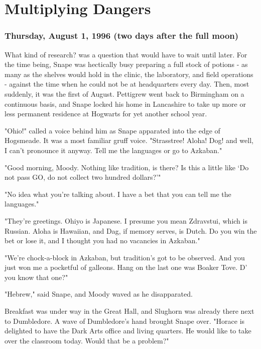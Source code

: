 
\chapter{Multiplying Dangers}

\subsection{Thursday, August 1, 1996 (two days after the full moon)}

What kind of research? was a question that would have to wait until later. For the time being, Snape was hectically busy preparing a full stock of potions - as many as the shelves would hold in the clinic, the laboratory, and field operations - against the time when he could not be at headquarters every day. Then, most suddenly, it was the first of August. Pettigrew went back to Birmingham on a continuous basis, and Snape locked his home in Lancashire to take up more or less permanent residence at Hogwarts for yet another school year.

"Ohio!" called a voice behind him as Snape apparated into the edge of Hogsmeade. It was a most familiar gruff voice. "Strasstree! Aloha! Dog! and{\el} well, I can't pronounce it anyway. Tell me the languages or go to Azkaban."

"Good morning, Moody. Nothing like tradition, is there? Is this a little like `Do not pass GO, do not collect two hundred dollars?'"

"No idea what you're talking about. I have a bet that you can tell me the languages."

"They're greetings. Ohiyo is Japanese. I presume you mean Zdravstui, which is Russian. Aloha is Hawaiian, and Dag, if memory serves, is Dutch. Do you win the bet or lose it, and I thought you had no vacancies in Azkaban."

"We're chock-a-block in Azkaban, but tradition's got to be observed. And you just won me a pocketful of galleons. Hang on{\el} the last one was Boaker Tove. D' you know that one?"

"Hebrew," said Snape, and Moody waved as he disapparated.

Breakfast was under way in the Great Hall, and Slughorn was already there next to Dumbledore. A wave of Dumbledore's hand brought Snape over. "Horace is delighted to have the Dark Arts office and living quarters. He would like to take over the classroom today. Would that be a problem?"

